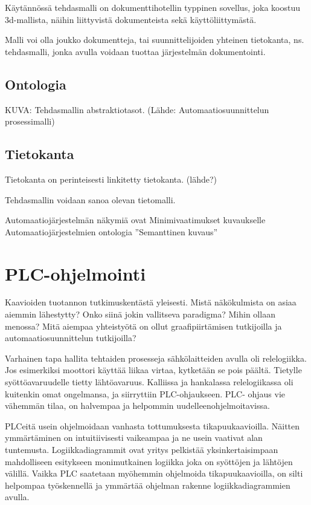 \documentclass[finnish,12pt]{article}
\begin{document}
Käytännössä tehdasmalli on dokumenttihotellin typpinen sovellus, joka koostuu 3d-mallista, näihin liittyvistä dokumenteista sekä käyttöliittymästä.

Malli voi olla joukko dokumentteja, tai suunnittelijoiden yhteinen tietokanta, ns. tehdasmalli, jonka avulla voidaan tuottaa järjestelmän dokumentointi.

		\subsection{Ontologia}


KUVA: Tehdasmallin abstraktiotasot. (Lähde: Automaatiosuunnittelun prosessimalli)

		\subsection{Tietokanta}

Tietokanta on perinteisesti linkitetty tietokanta. (lähde?)

Tehdasmallin voidaan sanoa olevan tietomalli.


Automaatiojärjestelmän näkymiä ovat
Minimivaatimukset kuvaukselle
Automaatiojärjestelmien ontologia
”Semanttinen kuvaus”

	\clearpage
	\section{PLC-ohjelmointi}

Kaavioiden tuotannon tutkimuskentästä yleisesti.
Mistä näkökulmista on asiaa aiemmin lähestytty?
Onko siinä jokin vallitseva paradigma?
Mihin ollaan menossa?
Mitä aiempaa yhteistyötä on ollut graafipiirtämisen tutkijoilla ja automaatiosuunnittelun tutkijoilla?

Varhainen tapa hallita tehtaiden prosesseja sähkölaitteiden avulla oli relelogiikka.
Jos esimerkiksi moottori käyttää liikaa virtaa, kytketään se pois päältä.
Tietylle syöttöavaruudelle tietty lähtöavaruus.
Kalliissa ja hankalassa relelogiikassa oli kuitenkin omat ongelmansa, ja siirryttiin PLC-ohjaukseen.
PLC- ohjaus vie vähemmän tilaa, on halvempaa ja helpommin uudelleenohjelmoitavissa.

PLCeitä usein ohjelmoidaan vanhasta tottumuksesta tikapuukaavioilla.
Näitten ymmärtäminen on intuitiivisesti vaikeampaa ja ne usein vaativat alan tuntemusta.
Logiikkadiagrammit ovat yritys pelkistää yksinkertaisimpaan mahdolliseen esitykseen monimutkainen logiikka joka on syöttöjen ja lähtöjen välillä.
Vaikka PLC saatetaan myöhemmin ohjelmoida tikapuukaavioilla, on silti helpompaa työskennellä ja ymmärtää ohjelman rakenne logiikkadiagrammien avulla.
\end{document}
